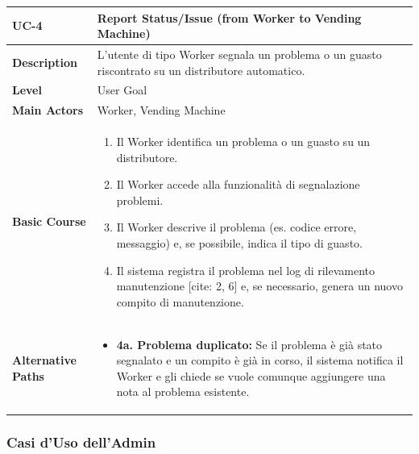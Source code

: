 \begin{table}[H]
\centering
\begin{tabularx}{\textwidth}{|p{2.5cm}|X|}
\hline
\textbf{UC-4} & \textbf{Report Status/Issue (from Worker to Vending Machine)} \\
\hline
\textbf{Description} & L'utente di tipo Worker segnala un problema o un guasto riscontrato su un distributore automatico. \\
\hline
\textbf{Level} & User Goal \\
\hline
\textbf{Main Actors} & Worker, Vending Machine \\
\hline
\textbf{Basic Course} &
\begin{enumerate}
    \item Il Worker identifica un problema o un guasto su un distributore.
    \item Il Worker accede alla funzionalità di segnalazione problemi.
    \item Il Worker descrive il problema (es. codice errore, messaggio) e, se possibile, indica il tipo di guasto.
    \item Il sistema registra il problema nel log di rilevamento manutenzione [cite: 2, 6] e, se necessario, genera un nuovo compito di manutenzione.
\end{enumerate} \\
\hline
\textbf{Alternative Paths} &
\begin{itemize}
    \item \textbf{4a. Problema duplicato:} Se il problema è già stato segnalato e un compito è già in corso, il sistema notifica il Worker e gli chiede se vuole comunque aggiungere una nota al problema esistente.
\end{itemize} \\
\hline
\end{tabularx}
\end{table}

\subsubsection{Casi d'Uso dell'Admin}


